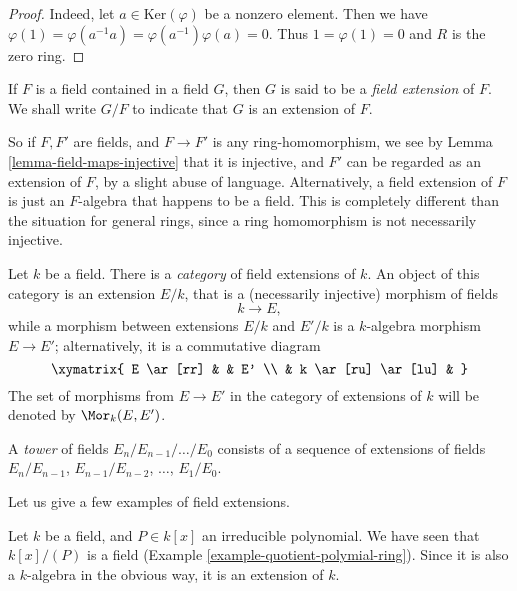 \begin{proof}
Indeed, let $a \in \text{Ker}(\varphi)$ be a nonzero element. Then we have
$\varphi(1) = \varphi(a^{-1} a) = \varphi(a^{-1}) \varphi(a) = 0$.
Thus $1 = \varphi(1) = 0$ and $R$ is the zero ring.
\end{proof}

\begin{definition}
\label{definition-extension}
If $F$ is a field contained in a field $G$, then $G$ is said
to be a {\it field extension} of $F$. We shall write $G/F$ to indicate
that $G$ is an extension of $F$.
\end{definition}

\noindent
So if $F, F'$ are fields, and $F \to F'$ is any ring-homomorphism, we see by
Lemma \ref{lemma-field-maps-injective} that it is injective, and $F'$ can be
regarded as an extension of $F$, by a slight abuse of language. Alternatively,
a field extension of $F$ is just an $F$-algebra that happens to be a field.
This is completely different than the situation for general rings, since a
ring homomorphism is not necessarily injective.

\medskip\noindent
Let $k$ be a field. There is a {\it category} of field extensions of $k$.
An object of this category is an extension $E/k$, that is a
(necessarily injective) morphism of fields
$$
k \to E,
$$
while a morphism between extensions $E/k$ and $E'/k$ is a $k$-algebra
morphism $E \to E'$; alternatively, it is a commutative diagram
$$
\xymatrix{
E \ar[rr] & & E' \\
& k \ar[ru] \ar[lu] &
}
$$
The set of morphisms from $E \to E'$ in the category of extensions of $k$
will be denoted by $\Mor_k(E, E')$.

\begin{definition}
\label{definition-tower}
A {\it tower} of fields $E_n/E_{n - 1}/\ldots/E_0$ consists of a sequence of
extensions of fields
$E_n/E_{n - 1}$, $E_{n - 1}/E_{n - 2}$, $\ldots$, $E_1/E_0$.
\end{definition}

\noindent
Let us give a few examples of field extensions.

\begin{example}
\label{example-monogenic-extension}
Let $k$ be a field, and $P \in k[x]$ an irreducible polynomial. We have
seen that $k[x]/(P)$ is a field (Example \ref{example-quotient-polymial-ring}).
Since it is also a $k$-algebra in the obvious way, it is an extension of $k$.
\end{example}


